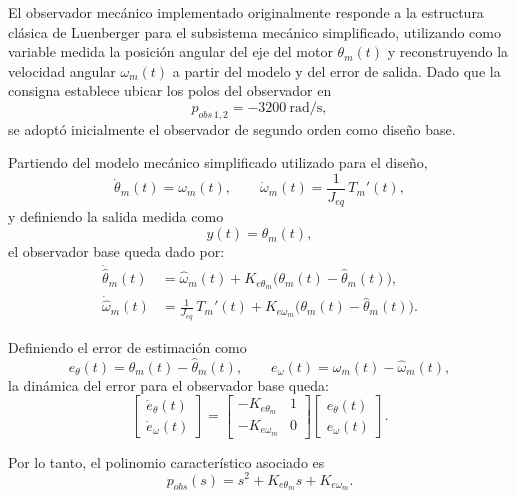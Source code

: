 \documentclass[12pt, a4paper,journal, onecolumn, compsoc]{IEEEtran}
\begin{document}
El observador mecánico implementado originalmente responde a la estructura clásica de Luenberger para el subsistema mecánico simplificado, utilizando como variable medida la posición angular del eje del motor $\theta_m(t)$ y reconstruyendo la velocidad angular $\omega_m(t)$ a partir del modelo y del error de salida. Dado que la consigna establece ubicar los polos del observador en
\[
p_{obs\,1,2}=-3200\ \text{rad/s},
\]
se adoptó inicialmente el observador de segundo orden como diseño base.

Partiendo del modelo mecánico simplificado utilizado para el diseño,
\begin{equation}
\dot{\theta}_m(t)=\omega_m(t), 
\qquad
\dot{\omega}_m(t)=\frac{1}{J_{eq}}\,T_m'(t),
\end{equation}
y definiendo la salida medida como
\begin{equation}
y(t)=\theta_m(t),
\end{equation}
el observador base queda dado por:
\begin{equation}
\label{eq:obs_base}
\begin{aligned}
    \dot{\hat{\theta}}_m(t) &= \hat{\omega}_m(t) + K_{e\theta_m}\big(\theta_m(t)-\hat{\theta}_m(t)\big), \\
    \dot{\hat{\omega}}_m(t) &= \frac{1}{J_{eq}}\,T_m'(t) + K_{e\omega_m}\big(\theta_m(t)-\hat{\theta}_m(t)\big).
\end{aligned}
\end{equation}

Definiendo el error de estimación como
\begin{equation}
e_\theta(t)=\theta_m(t)-\hat{\theta}_m(t),
\qquad
e_\omega(t)=\omega_m(t)-\hat{\omega}_m(t),
\end{equation}
la dinámica del error para el observador base queda:
\begin{equation}
\begin{bmatrix}
\dot e_\theta(t)\\
\dot e_\omega(t)
\end{bmatrix}
=
\begin{bmatrix}
-K_{e\theta_m} & 1\\
-K_{e\omega_m} & 0
\end{bmatrix}
\begin{bmatrix}
e_\theta(t)\\
e_\omega(t)
\end{bmatrix}.
\end{equation}

Por lo tanto, el polinomio característico asociado es
\begin{equation}
p_{obs}(s)=s^2+K_{e\theta_m}s+K_{e\omega_m}.
\end{equation}
\end{document}
